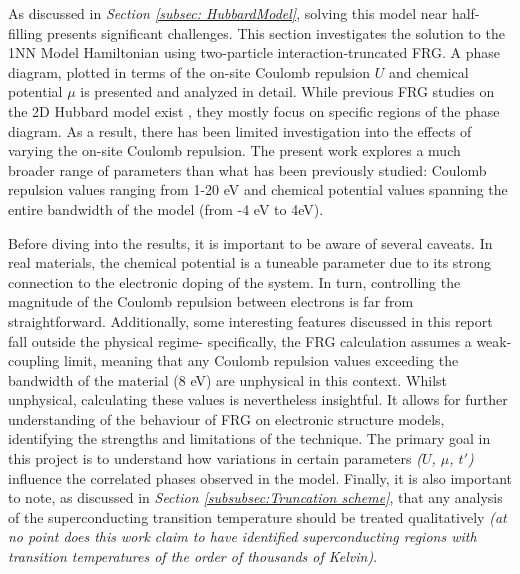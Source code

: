 \documentclass[12pt]{article}
\begin{document}
\noindent As discussed in \textit{Section \ref{subsec: HubbardModel}}, solving this model near half-filling presents significant challenges. 
This section investigates the solution to the 1NN Model Hamiltonian using two-particle interaction-truncated FRG.
A phase diagram, plotted in terms of the on-site Coulomb repulsion 
$U$ and chemical potential $\mu$ is presented and analyzed in detail. While previous FRG studies on the 2D Hubbard model exist \cite{beyer2023rashba,hille2020quantitative,vilardi2020dynamical},
they mostly focus on specific regions of the phase diagram. As a result, there has been limited investigation into the effects of varying the on-site Coulomb repulsion.
The present work explores a much broader range of parameters than what has been previously studied: Coulomb repulsion values ranging from 1-20 eV 
and chemical potential values spanning the entire bandwidth of the model (from -4 eV to 4eV). \par

\medskip


\noindent Before diving into the results, it is important to be aware of several caveats. In real materials,  the chemical potential is a tuneable parameter due to its strong connection to the electronic doping of the system.
In turn, controlling the magnitude of the Coulomb repulsion between electrons is far from straightforward. 
Additionally, some interesting features discussed in this report fall outside the physical regime- specifically, the FRG calculation assumes a weak-coupling limit, meaning that any Coulomb 
repulsion values exceeding the bandwidth of the material (8 eV) are unphysical in this context.
Whilst unphysical, calculating these values is nevertheless insightful. It allows for further
understanding of the behaviour of FRG on electronic structure models, identifying the 
strengths and limitations of the technique. The primary goal in this project is to understand how variations in certain parameters \textit{($U$, $\mu$, $t'$)} influence the correlated phases observed in the model. 
Finally, it is also important to note, as discussed in \textit{Section \ref{subsubsec:Truncation scheme}}, that any analysis of the 
superconducting transition temperature should be treated qualitatively \textit{(at no point does this work claim to have identified superconducting 
regions with transition temperatures of the order of thousands of Kelvin)}.
\end{document}
